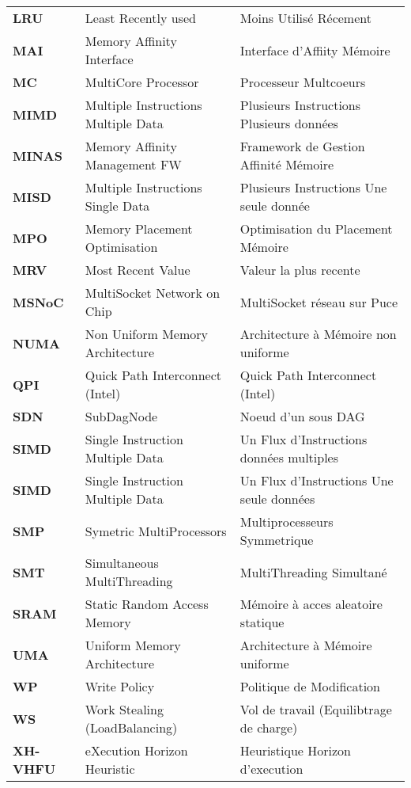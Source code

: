 \begin{tabular}{ l l l }
\textbf{LRU}  	& Least Recently used & Moins Utilisé Récement  \\[0.6ex]
\textbf{MAI }  	& Memory Affinity Interface & Interface d'Affiity Mémoire \\[0.6ex]
\textbf{MC }  	& MultiCore Processor  & Processeur Multcoeurs \\[0.6ex]
\textbf{MIMD}  	& Multiple Instructions Multiple Data  & Plusieurs Instructions Plusieurs données \\[0.6ex]
\textbf{MINAS} 	& Memory Affinity Management FW & Framework de Gestion Affinité Mémoire \\[0.6ex]
\textbf{MISD}  	& Multiple Instructions Single Data  & Plusieurs Instructions Une seule donnée\\[0.6ex]
\textbf{MPO }  	& Memory Placement Optimisation & Optimisation du Placement Mémoire\\[0.6ex]
\textbf{MRV}  	& Most Recent Value & Valeur la plus recente \\[0.6ex]
\textbf{MSNoC}	& MultiSocket Network on Chip & MultiSocket réseau sur Puce \\[0.6ex]
\textbf{NUMA}  	& Non Uniform Memory Architecture  & Architecture à Mémoire non uniforme \\[0.6ex]
\textbf{QPI}  	& Quick Path Interconnect (Intel) & Quick Path Interconnect (Intel) \\[0.6ex]
\textbf{SDN }  	& SubDagNode & Noeud d'un sous DAG \\[0.6ex]
\textbf{SIMD}  	& Single Instruction Multiple Data  & Un Flux d'Instructions données multiples\\[0.6ex]
\textbf{SIMD}  	& Single Instruction Multiple Data  & Un Flux d'Instructions Une seule données\\[0.6ex]
\textbf{SMP}  	& Symetric MultiProcessors & Multiprocesseurs Symmetrique \\[0.6ex]
\textbf{SMT}  	& Simultaneous MultiThreading  & MultiThreading Simultané \\[0.6ex]
\textbf{SRAM}  	& Static Random Access Memory      & Mémoire à acces aleatoire statique \\[0.6ex]
\textbf{UMA}  	& Uniform Memory Architecture  & Architecture à Mémoire uniforme \\[0.6ex]
\textbf{WP }  	& Write Policy & Politique de Modification \\[0.6ex]
\textbf{WS }  	& Work Stealing (LoadBalancing) & Vol de travail (Equilibtrage de charge) \\[0.6ex]
\textbf{XH-VHFU}  & eXecution Horizon Heuristic  & Heuristique Horizon d'execution
 \end{tabular}

 